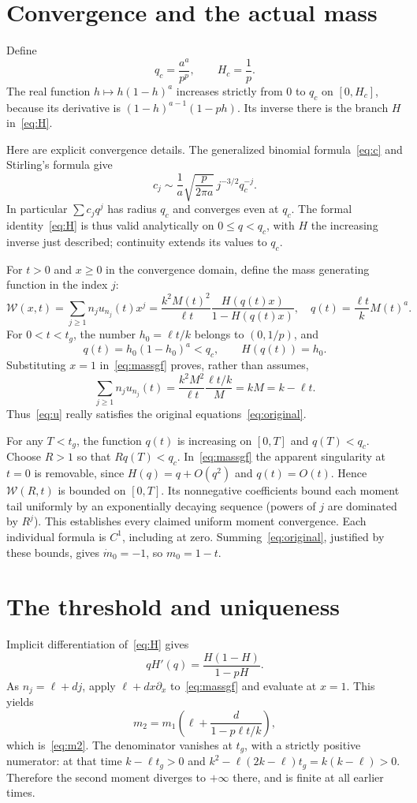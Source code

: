 \documentclass[11pt,a4paper]{report}
\begin{document}
\section{Convergence and the actual mass}
Define
\[
q_c=\frac{a^a}{p^p},\qquad H_c=\frac1p.
\]
The real function $h\mapsto h(1-h)^a$ increases strictly from $0$ to $q_c$ on $[0,H_c]$, because its derivative is $(1-h)^{a-1}(1-ph)$. Its inverse there is the branch $H$ in~\eqref{eq:H}.

Here are explicit convergence details. The generalized binomial formula~\eqref{eq:c} and Stirling's formula give
\begin{equation}\label{eq:stirling}
c_j\sim\frac1a\sqrt{\frac{p}{2\pi a}}\,j^{-3/2}q_c^{-j}.
\end{equation}
In particular $\sum c_jq^j$ has radius $q_c$ and converges even at $q_c$. The formal identity~\eqref{eq:H} is thus valid analytically on $0\le q<q_c$, with $H$ the increasing inverse just described; continuity extends its values to $q_c$.

For $t>0$ and $x\ge0$ in the convergence domain, define the mass generating function in the index $j$:
\begin{equation}\label{eq:massgf}
\mathcal W(x,t)=\sum_{j\ge1}n_j u_{n_j}(t)x^j
=\frac{k^2 M(t)^2}{\ell t}\frac{H(q(t)x)}{1-H(q(t)x)},
\quad q(t)=\frac{\ell t}{k}M(t)^a.
\end{equation}
For $0<t<t_g$, the number $h_0=\ell t/k$ belongs to $(0,1/p)$, and
\[
q(t)=h_0(1-h_0)^a<q_c,\qquad H(q(t))=h_0.
\]
Substituting $x=1$ in~\eqref{eq:massgf} proves, rather than assumes,
\[
\sum_{j\ge1}n_j u_{n_j}(t)
=\frac{k^2M^2}{\ell t}\frac{\ell t/k}{M}=kM=k-\ell t.
\]
Thus~\eqref{eq:u} really satisfies the original equations~\eqref{eq:original}.

For any $T<t_g$, the function $q(t)$ is increasing on $[0,T]$ and $q(T)<q_c$. Choose $R>1$ so that $Rq(T)<q_c$. In~\eqref{eq:massgf} the apparent singularity at $t=0$ is removable, since $H(q)=q+O(q^2)$ and $q(t)=O(t)$. Hence $\mathcal W(R,t)$ is bounded on $[0,T]$. Its nonnegative coefficients bound each moment tail uniformly by an exponentially decaying sequence (powers of $j$ are dominated by $R^j$). This establishes every claimed uniform moment convergence. Each individual formula is $C^1$, including at zero. Summing~\eqref{eq:original}, justified by these bounds, gives $\dot m_0=-1$, so $m_0=1-t$.

\section{The threshold and uniqueness}
Implicit differentiation of~\eqref{eq:H} gives
\[
qH'(q)=\frac{H(1-H)}{1-pH}.
\]
As $n_j=\ell+dj$, apply $\ell+dx\partial_x$ to~\eqref{eq:massgf} and evaluate at $x=1$. This yields
\[
m_2=m_1\left(\ell+\frac{d}{1-p\ell t/k}\right),
\]
which is~\eqref{eq:m2}. The denominator vanishes at $t_g$, with a strictly positive numerator: at that time $k-\ell t_g>0$ and $k^2-\ell(2k-\ell)t_g=k(k-\ell)>0$. Therefore the second moment diverges to $+\infty$ there, and is finite at all earlier times.
\end{document}
